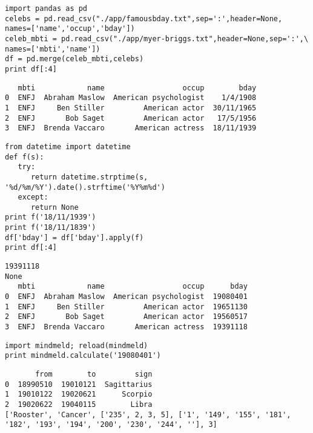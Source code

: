 \documentclass[12pt,fleqn]{article}\usepackage{common}
\begin{document}
\begin{verbatim}
import pandas as pd
celebs = pd.read_csv("./app/famousbday.txt",sep=':',header=None, 
names=['name','occup','bday'])
celeb_mbti = pd.read_csv("./app/myer-briggs.txt",header=None,sep=':',\
names=['mbti','name'])
df = pd.merge(celeb_mbti,celebs)
print df[:4]
\end{verbatim}

\begin{verbatim}
   mbti            name                  occup        bday
0  ENFJ  Abraham Maslow  American psychologist    1/4/1908
1  ENFJ     Ben Stiller         American actor  30/11/1965
2  ENFJ       Bob Saget         American actor   17/5/1956
3  ENFJ  Brenda Vaccaro       American actress  18/11/1939
\end{verbatim}

\begin{verbatim}
from datetime import datetime
def f(s):
   try:
      return datetime.strptime(s, '%d/%m/%Y').date().strftime('%Y%m%d')
   except: 
      return None
print f('18/11/1939')
print f('18/11/1839')
df['bday'] = df['bday'].apply(f)
print df[:4]
\end{verbatim}

\begin{verbatim}
19391118
None
   mbti            name                  occup      bday
0  ENFJ  Abraham Maslow  American psychologist  19080401
1  ENFJ     Ben Stiller         American actor  19651130
2  ENFJ       Bob Saget         American actor  19560517
3  ENFJ  Brenda Vaccaro       American actress  19391118
\end{verbatim}

\begin{verbatim}
import mindmeld; reload(mindmeld)
print mindmeld.calculate('19080401')
\end{verbatim}

\begin{verbatim}
       from        to         sign
0  18990510  19010121  Sagittarius
1  19010122  19020621      Scorpio
2  19020622  19040115        Libra
['Rooster', 'Cancer', ['235', 2, 3, 5], ['1', '149', '155', '181', '182', '193', '194', '200', '230', '244', ''], 3]
\end{verbatim}

\begin{verbatim}
\end{verbatim}
\end{document}
